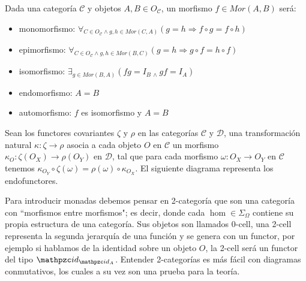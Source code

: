 \begin{defn}
Dada una categoría $\mathcal{C}$ y objetos $ A,B \in O_{\mathcal{C}}$, un morfismo $f \in Mor(A,B)$ será:
\end{defn}
\begin{itemize}
\item monomorfismo: $\forall_{ C \in O_{\mathcal{C}} \wedge g,h \in Mor(C,A)}(g=h \Rightarrow f \circ g=f\circ h)$
\item epimorfismo: $\forall_{ C \in O_{\mathcal{C}} \wedge g,h \in Mor(B,C)}(g=h \Rightarrow g \circ f=h\circ f)$
\item isomorfismo: $\exists_{g \in Mor(B,A)} ( fg = I_{B} \ _{\wedge} \ gf = I_{A})$
\item endomorfismo: $A=B$
\item automorfismo: $f$ es isomorfismo y $A=B$
\end{itemize}

\begin{defn}\end{defn}
Sean los functores covariantes $\zeta$ y $\rho$ en las categorías $\mathcal{C}$ y $\mathcal{D}$, una transformación natural $\kappa : \zeta \rightarrow \rho$ asocia a cada objeto $O$ en $\mathcal{C}$ un morfismo 
$\kappa_{O} : \zeta(O_X) \rightarrow \rho(O_Y)$ en $\mathcal{D}$, tal que para cada morfismo $\omega : O_X \rightarrow O_Y$ en $\mathcal{C}$ tenemos $\kappa_{O_Y} \circ \zeta(\omega) = \rho(\omega) \circ \kappa_{O_X}$. El siguiente diagrama representa los endofunctores.

\begin{figure}[h!]
\centerline{
}
\end{figure}

\begin{note}
Para introducir monadas debemos pensar en 2-categoría que son una categoría con ``morfismos entre morfismos"; es decir, donde cada $\hom \in \Sigma_{\Omega}$ contiene su propia estructura de una categoría. Sus objetos son llamados 0-cell, una 2-cell representa la segunda jerarquía de una función y se genera con un functor, por ejemplo si hablamos de la identidad sobre un objeto $O$, la 2-cell será un functor del tipo $\id_{\id_{A}}$. Entender 2-categorías es más fácil con diagramas conmutativos, los cuales a su vez son una prueba para la teoría.
\end{note}

